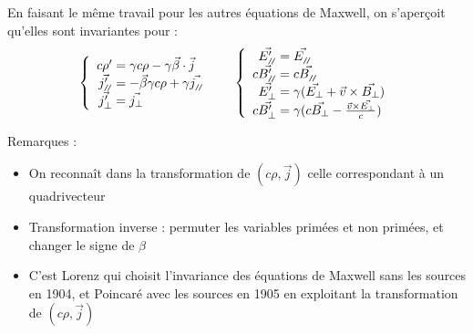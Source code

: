 En faisant le même travail pour les autres équations de Maxwell, on s'aperçoit qu'elles sont invariantes pour :
$$
\left\{ \begin{array}{r@{\;}l}
	c\rho '&=\gamma c\rho-\gamma\vec{\beta}\cdot\vec{j}\\
	\vec{j'_{\para}}&=-\vec{\beta}\gamma c\rho+\gamma\vec{j_{\para}}\\
	\vec{j'_{\perp}}&=\vec{j_{\perp}}
\end{array} \right.\\[10pt]\indent
\left\{ \begin{array}{r@{\;}l}
	\vec{E'_{\para}}&=\vec{E_{\para}}\\
	c\vec{B'_{\para}}&=c\vec{B_{\para}}\\
	\vec{E'_{\perp}}&=\gamma(\vec{E_{\perp}}+\vec{v}\times\vec{B_{\perp}})\\
	c\vec{B'_{\perp}}&=\gamma(c\vec{B_{\perp}}-\frac{\vec{v}\times\vec{E_{\perp}}}{c})
\end{array} \right.\\
$$


Remarques : 
\begin{itemize}
	\item On reconna\^it dans la transformation de $(c\rho,\vec{j})$ celle correspondant à un quadrivecteur
	\item Transformation inverse : permuter les variables primées et non primées, et changer le signe de $\beta$
	\item C'est Lorenz qui choisit l'invariance des équations de Maxwell sans les sources en 1904, et Poincaré avec les sources en 1905 en exploitant la transformation de $(c\rho,\vec{j})$
\end{itemize}

